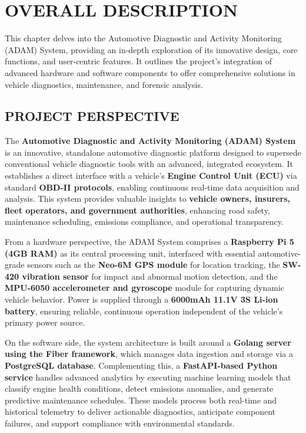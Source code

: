 \chapter{OVERALL DESCRIPTION}

This chapter delves into the Automotive Diagnostic and Activity Monitoring (ADAM) System, providing an in-depth exploration of its innovative design, core functions, and user-centric features. It outlines the project’s integration of advanced hardware and software components to offer comprehensive solutions in vehicle diagnostics, maintenance, and forensic analysis.

\section{PROJECT PERSPECTIVE}

The \textbf{Automotive Diagnostic and Activity Monitoring (ADAM) System} is an innovative, standalone automotive diagnostic platform designed to supersede conventional vehicle diagnostic tools with an advanced, integrated ecosystem. It establishes a direct interface with a vehicle's \textbf{Engine Control Unit (ECU)} via standard \textbf{OBD-II protocols}, enabling continuous real-time data acquisition and analysis. This system provides valuable insights to \textbf{vehicle owners, insurers, fleet operators, and government authorities}, enhancing road safety, maintenance scheduling, emissions compliance, and operational transparency.

\vspace{0.3cm}

From a hardware perspective, the ADAM System comprises a \textbf{Raspberry Pi 5 (4GB RAM)} as its central processing unit, interfaced with essential automotive-grade sensors such as the \textbf{Neo-6M GPS module} for location tracking, the \textbf{SW-420 vibration sensor} for impact and abnormal motion detection, and the \textbf{MPU-6050 accelerometer and gyroscope} module for capturing dynamic vehicle behavior. Power is supplied through a \textbf{6000mAh 11.1V 3S Li-ion battery}, ensuring reliable, continuous operation independent of the vehicle’s primary power source.

\vspace{0.3cm}

On the software side, the system architecture is built around a \textbf{Golang server using the Fiber framework}, which manages data ingestion and storage via a \textbf{PostgreSQL database}. Complementing this, a \textbf{FastAPI-based Python service} handles advanced analytics by executing machine learning models that classify engine health conditions, detect emissions anomalies, and generate predictive maintenance schedules. These models process both real-time and historical telemetry to deliver actionable diagnostics, anticipate component failures, and support compliance with environmental standards.

